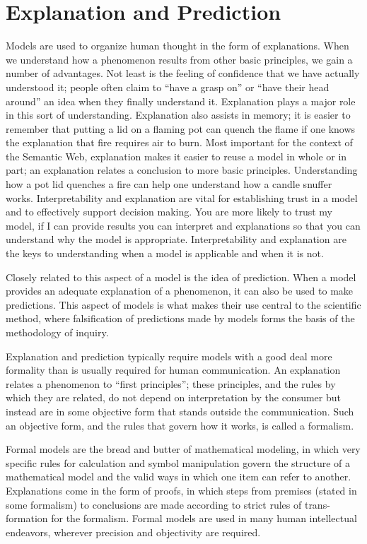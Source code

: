 \section{Explanation and Prediction}

Models are used to organize human thought in the form of explanations.
When we understand how a phenomenon results from other basic principles,
we gain a number of advantages. Not least is the feeling of confidence
that we have actually understood it; people often claim to ``have a
grasp on'' or ``have their head around'' an idea when they finally
understand it. Explanation plays a major role in this sort of
understanding. Explanation also assists in memory; it is easier to
remember that putting a lid on a flaming pot can quench the flame if one
knows the explanation that fire requires air to burn. Most important for
the context of the Semantic Web, explanation makes it easier to reuse a
model in whole or in part; an explanation relates a conclusion to more
basic principles. Understanding how a pot lid quenches a fire can help
one understand how a candle snuffer works. Interpretability and
explanation are vital for establishing trust in a model and to
effectively support decision making. You are more likely to trust my
model, if I can provide results you can interpret and explanations so
that you can understand why the model is appropriate. Interpretability
and explanation are the keys to understanding when a model is applicable
and when it is not.

Closely related to this aspect of a model is the idea of prediction.
When a model provides an adequate explanation of a phenomenon, it can
also be used to make predictions. This aspect of models is what makes
their use central to the scientific method, where falsification of
predictions made by models forms the basis of the methodology of
inquiry.

Explanation and prediction typically require models with a good deal
more formality than is usually required for human communication. An
explanation relates a phenomenon to ``first principles''; these
principles, and the rules by which they are related, do not depend on
interpretation by the consumer but instead are in some objective form
that stands outside the communication. Such an objective form, and the
rules that govern how it works, is called a formalism.

Formal models are the bread and butter of mathematical modeling, in
which very specific rules for calculation and symbol manipulation govern
the structure of a mathematical model and the valid ways in which one
item can refer to another. Explanations come in the form of proofs, in
which steps from premises (stated in some formalism) to conclusions are
made according to strict rules of trans- formation for the formalism.
Formal models are used in many human intellectual endeavors, wherever
precision and objectivity are required.

